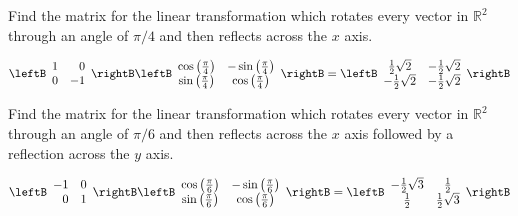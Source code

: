 \begin{enumialphparenastyle}
\begin{ex} Find the matrix for the linear transformation which rotates every
vector in $\mathbb{R}^{2}$ through an angle of $\pi /4$ and then reflects
across the $x$ axis.
\begin{sol}
\[
\leftB
\begin{array}{rr}
1 & 0 \\
0 & -1
\end{array}
\rightB \leftB
\begin{array}{cc}
\cos \left( \frac{\pi }{4}\right)  & -\sin \left( \frac{\pi }{4}\right)  \\
\sin \left( \frac{\pi }{4}\right)  & \cos \left( \frac{\pi }{4}\right)
\end{array}
\rightB  =  \leftB
\begin{array}{cc}
\frac{1}{2}\sqrt{2} & -\frac{1}{2}\sqrt{2} \\
-\frac{1}{2}\sqrt{2} & -\frac{1}{2}\sqrt{2}
\end{array}
\rightB
\]
\end{sol}
\end{ex}

\begin{ex} Find the matrix for the linear transformation which rotates every
vector in $\mathbb{R}^{2}$ through an angle of $\pi /6$ and then reflects
across the $x$ axis followed by a reflection across the $y$ axis.
\begin{sol}
\[
\leftB
\begin{array}{rr}
-1 & 0 \\
0 & 1
\end{array}
\rightB \leftB
\begin{array}{cc}
\cos \left( \frac{\pi }{6}\right)  & -\sin \left( \frac{\pi }{6}\right)  \\
\sin \left( \frac{\pi }{6}\right)  & \cos \left( \frac{\pi }{6}\right)
\end{array}
\rightB = \leftB
\begin{array}{cc}
-\frac{1}{2}\sqrt{3} & \frac{1}{2} \\
\frac{1}{2} & \frac{1}{2}\sqrt{3}
\end{array}
\rightB
\]
\end{sol}
\end{ex}


\end{enumialphparenastyle}
